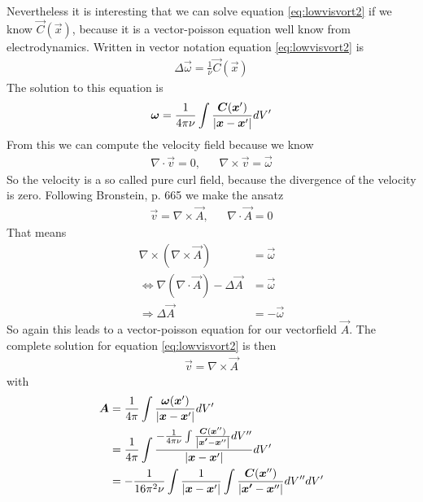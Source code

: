 Nevertheless it is interesting that we can solve equation
\eqref{eq:lowvisvort2} if we know $\vec{C}(\vec{x})$, because it is a 
vector-poisson equation well know from electrodynamics.
Written in vector notation equation \eqref{eq:lowvisvort2} is
\begin{align}
\Delta \vec{\omega} = \frac{1}{\nu} \vec{C}(\vec{x})
\end{align}
The solution to this equation is
\begin{align}
\boldsymbol{\omega} = 
\frac{1}{4 \pi \nu} 
\int \frac{\boldsymbol{C}(\boldsymbol{x}')}{\left\lvert\boldsymbol{x}-\boldsymbol{x}'\right\rvert} dV'
\end{align}
From this we can compute the velocity field because we know
\begin{align}
\nabla \cdot \vec{v} = 0,&& \nabla \times \vec{v} = \vec{\omega}
\end{align}
So the velocity is a so called pure curl field, because the divergence
of the velocity is zero. Following Bronstein, p. 665 we make the ansatz
\begin{align}
\vec{v}= \nabla \times \vec{A},&& \nabla \cdot \vec{A} = 0
\end{align}
That means
\begin{align}
\nabla \times (\nabla \times \vec{A}) &= \vec{\omega}\\
\Leftrightarrow \nabla(\nabla \cdot \vec{A}) - \Delta \vec{A} &= \vec{\omega}\\
\Rightarrow \Delta \vec{A} &= -\vec{\omega}
\end{align}
So again this leads to a vector-poisson equation for our vectorfield $\vec{A}$.
The complete solution for equation \eqref{eq:lowvisvort2} is then
\begin{align}
\vec{v}= \nabla \times \vec{A} 
\end{align}
with
\begin{align}
\boldsymbol{A} &=\frac{1}{4 \pi} 
\int \frac{\boldsymbol{\omega}(\boldsymbol{x}')}{\left\lvert\boldsymbol{x}-\boldsymbol{x}'\right\rvert} dV'\\
&=\frac{1}{4 \pi} 
\int \frac{-\frac{1}{4 \pi \nu} 
\int \frac{\boldsymbol{C}(\boldsymbol{x}'')}{\left\lvert\boldsymbol{x'}-\boldsymbol{x}''\right\rvert} dV''}
{\left\lvert\boldsymbol{x}-\boldsymbol{x}'\right\rvert} dV'\\
&= -\frac{1}{16 \pi^2 \nu} \int \frac{1}{\left\lvert\boldsymbol{x}-\boldsymbol{x}'\right\rvert}
\int \frac{\boldsymbol{C}(\boldsymbol{x}'')}{\left\lvert\boldsymbol{x'}-\boldsymbol{x}''\right\rvert} dV'' dV'
\end{align}





